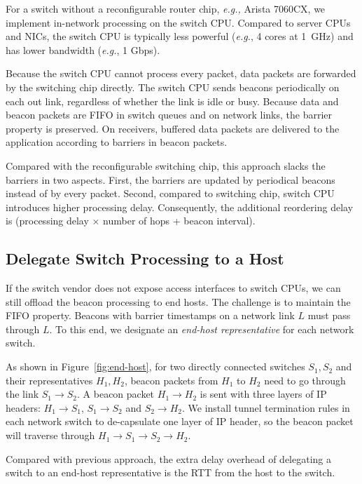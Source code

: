 For a switch without a reconfigurable router chip, \textit{e.g.,} Arista 7060CX, we implement in-network processing on the switch CPU. 
Compared to server CPUs and NICs, the switch CPU is typically less powerful (\textit{e.g.}, 4 cores at 1~GHz) and has lower bandwidth (\textit{e.g.}, 1 Gbps).

Because the switch CPU cannot process every packet, data packets are forwarded by the switching chip directly. 
The switch CPU sends beacons periodically on each out link, regardless of whether the link is idle or busy.
Because data and beacon packets are FIFO in switch queues and on network links, the barrier property is preserved. On receivers, buffered data packets are delivered to the application according to barriers in beacon packets.

Compared with the reconfigurable switching chip, this approach slacks the barriers in two aspects.
First, the barriers are updated by periodical beacons instead of by every packet.
Second, compared to switching chip, switch CPU introduces higher processing delay. Consequently, the additional reordering delay is (processing delay $\times$ number of hops + beacon interval).

\subsection{Delegate Switch Processing to a Host}
\label{sec:end-host}

If the switch vendor does not expose access interfaces to switch CPUs, we can still offload the beacon processing to end hosts. The challenge is to maintain the FIFO property. Beacons with barrier timestamps on a network link $L$ must pass through $L$. To this end, we designate an \textit{end-host representative} for each network switch. %

As shown in Figure~\ref{fig:end-host}, for two directly connected switches $S_1, S_2$ and their representatives $H_1, H_2$, beacon packets from $H_1$ to $H_2$ need to go through the link $S_1 \rightarrow S_2$. A beacon packet $H_1 \rightarrow H_2$ is sent with three layers of IP headers: $H_1 \rightarrow S_1$, $S_1 \rightarrow S_2$ and $S_2 \rightarrow H_2$.
We install tunnel termination rules in each network switch to de-capsulate one layer of IP header, so the beacon packet will traverse through $H_1 \rightarrow S_1 \rightarrow S_2 \rightarrow H_2$.

Compared with previous approach, the extra delay overhead of delegating a switch to an end-host representative is the RTT from the host to the switch.
